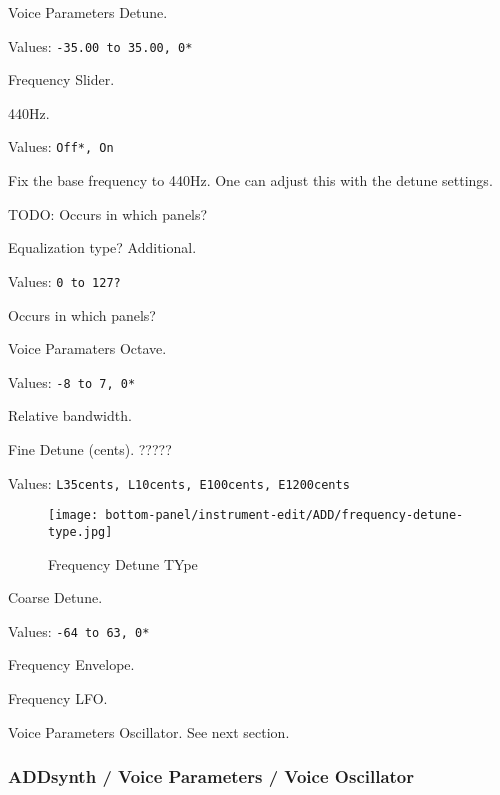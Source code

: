    \setcounter{ItemCounter}{0}      %

   Voice Parameters Detune.

   Values: \texttt{-35.00 to 35.00, 0*}

   Frequency Slider.

   440Hz.

   Values: \texttt{Off*, On}

   Fix the base frequency to 440Hz.
   One can adjust this with the detune settings.

   TODO: Occurs in which panels?

   Equalization type?  Additional.

   Values: \texttt{0 to 127?}

   Occurs in which panels?

   Voice Paramaters Octave.

   Values: \texttt{-8 to 7, 0*}

   Relative bandwidth.

   Fine Detune (cents). ?????

   Values: \texttt{L35cents, L10cents, E100cents, E1200cents}

\begin{figure}[H]
   \centering 
   \texttt{[image: bottom-panel/instrument-edit/ADD/frequency-detune-type.jpg]}
   \caption{Frequency Detune TYpe}
   \label{fig:frequency_detune_tYpe}
\end{figure}

   Coarse Detune.

   Values: \texttt{-64 to 63, 0*}

   Frequency Envelope.

   Frequency LFO.

   Voice Parameters Oscillator.
   See next section.

\subsubsection{ADDsynth / Voice Parameters / Voice Oscillator}
\label{subsubsec:addsynth_voice_parameters_oscillator}

